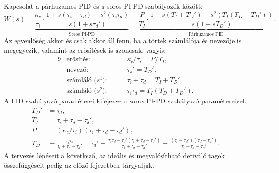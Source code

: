 Kapcsolat a párhuzamos PID és a soros PI-PD szabályozók között:
\begin{equation}
  W(s)
  = \underbrace{
    \frac{\kappa_c}{\tau_i} \cdot
    \frac{1 + s (\tau_i + \tau_d) + s^2 (\tau_i \tau_d)}{s(1 + s\tau_d')}
  }_\text{Soros PI-PD}
  = \underbrace{
    \frac{P}{T_I} \cdot
    \frac{1 + s(T_I + T_D') + s^2(T_I(T_D + T_D'))}{s(1 + sT_D')}
  }_\text{Párhuzamos PID}
  .
  \label{eq:PIPD-2}
\end{equation}
Az egyenlőség akkor és csak akkor áll fenn, ha a törtek számlálója és nevezője
is megegyezik, valamint az erősítések is azonosak, vagyis:
\begin{alignat}{9}
   & \text{erősítés: } \quad
   &                                 & {\kappa_c}/{\tau_i} = {P}/{T_I}
  ,
  \\
   & \text{nevező: } \quad
   &                                 & \tau_d' = T_D'
  ,
  \\
   & \text{számláló ($s^1$): } \quad
   &                                 & \tau_i + \tau_d = T_I + T_D'
  ,
  \\
   & \text{számláló ($s^2$): } \quad
   &                                 & \tau_i \tau_d = T_I(T_D + T_D')
  .
\end{alignat}
A PID szabályozó paraméterei kifejezve a soros PI-PD szabályozó paramétereivel:
\begin{align}
  T_D' & = \tau_d
  ,
  \\
  T_I  & = \tau_i + \tau_d - \tau_d'
  ,
  \\
  P    & = (\kappa_c / \tau_i)(\tau_i + \tau_d - \tau_d')
  ,
  \\
  T_D  & = \frac{\tau_i \tau_d}{\tau_i + \tau_d - \tau_d'} - \tau_d'
  = \frac{
    \tau_i \tau_d - \tau_d'(\tau_i + \tau_d - \tau_d')
  }{\tau_i + \tau_d - \tau_d'}
  = \frac{(\tau_i - \tau_d')(\tau_d - \tau_d')}{\tau_i + \tau_d - \tau_d'}
  .
\end{align}
A tervezés lépéseit a következő, az ideális és megvalósítható deriváló tagok
összefüggéseit pedig az előző fejezetben tárgyaljuk.
